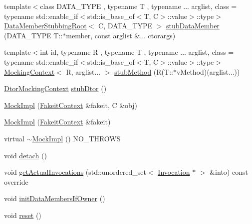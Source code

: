 \begin{DoxyCompactItemize}
{\footnotesize template$<$class D\+A\+T\+A\+\_\+\+T\+Y\+PE , typename T , typename ... arglist, class  = typename std\+::enable\+\_\+if$<$std\+::is\+\_\+base\+\_\+of$<$\+T, C$>$\+::value$>$\+::type$>$ }\\\mbox{\hyperlink{classfakeit_1_1DataMemberStubbingRoot}{Data\+Member\+Stubbing\+Root}}$<$ C, D\+A\+T\+A\+\_\+\+T\+Y\+PE $>$ \mbox{\hyperlink{classfakeit_1_1MockImpl_acaa4bcb3984d3ca5fd1ecb3095393951}{stub\+Data\+Member}} (D\+A\+T\+A\+\_\+\+T\+Y\+PE T\+::$\ast$member, const arglist \&... ctorargs)
\item 
{\footnotesize template$<$int id, typename R , typename T , typename ... arglist, class  = typename std\+::enable\+\_\+if$<$std\+::is\+\_\+base\+\_\+of$<$\+T, C$>$\+::value$>$\+::type$>$ }\\\mbox{\hyperlink{classfakeit_1_1MockingContext}{Mocking\+Context}}$<$ R, arglist... $>$ \mbox{\hyperlink{classfakeit_1_1MockImpl_a603befd40e35ea88c7efee965f15bb60}{stub\+Method}} (R(T\+::$\ast$v\+Method)(arglist...))
\item 
\mbox{\hyperlink{classfakeit_1_1DtorMockingContext}{Dtor\+Mocking\+Context}} \mbox{\hyperlink{classfakeit_1_1MockImpl_ae64cb908c91a96faefbf0fabac948f29}{stub\+Dtor}} ()
\item 
\mbox{\hyperlink{classfakeit_1_1MockImpl_aeabb99e36f2ef5fea7856db165fe01d3}{Mock\+Impl}} (\mbox{\hyperlink{structfakeit_1_1FakeitContext}{Fakeit\+Context}} \&fakeit, C \&obj)
\item 
\mbox{\hyperlink{classfakeit_1_1MockImpl_ae6f86001c16b110046453433ba2d36e8}{Mock\+Impl}} (\mbox{\hyperlink{structfakeit_1_1FakeitContext}{Fakeit\+Context}} \&fakeit)
\item 
virtual \mbox{\hyperlink{classfakeit_1_1MockImpl_aafbd9e9c1f6691f7cee440c52ae07220}{$\sim$\+Mock\+Impl}} () N\+O\+\_\+\+T\+H\+R\+O\+WS
\item 
void \mbox{\hyperlink{classfakeit_1_1MockImpl_a48e09b74451cf9c435aab31b077cce26}{detach}} ()
\item 
void \mbox{\hyperlink{classfakeit_1_1MockImpl_a04c3121eb7d380226f1beabf4b18ee82}{get\+Actual\+Invocations}} (std\+::unordered\+\_\+set$<$ \mbox{\hyperlink{structfakeit_1_1Invocation}{Invocation}} $\ast$ $>$ \&into) const override
\item 
void \mbox{\hyperlink{classfakeit_1_1MockImpl_ad403c33f4734e31196ead952fc4c4805}{init\+Data\+Members\+If\+Owner}} ()
\item 
void \mbox{\hyperlink{classfakeit_1_1MockImpl_aad69a9c36fc64d0890f21ff15318a206}{reset}} ()
\item 

\end{DoxyCompactItemize}
